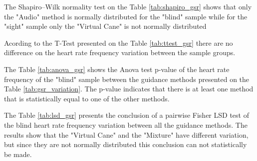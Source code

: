 
%
%    
%
%
%
%
%    
%
The Shapiro–Wilk normality test on the Table \ref{tab:shapiro_gsr} shows that only the "Audio" method is normally distributed for the "blind" sample while for the "sight" sample only the "Virtual Cane" is not normally distributed



Acording to the T-Test presented on the Table \ref{tab:ttest_gsr} there are no difference on the heart rate frequency variation between the sample groups.



The Table \ref{tab:anova_gsr} shows the Anova test p-value of the heart rate frequency of the "blind" sample between the guidance methods presented on the Table \ref{tab:gsr_variation}. The p-value indicates that there is at least one method that is statistically equal to one of the other methods.



The Table \ref{tab:lsd_gsr} presents the conclusion of a pairwise Fisher LSD test of the blind heart rate frequency variation between all the guidance methods. The results show that the "Virtual Cane" and the "Mixture" have different variation, but since they are not normally distributed this conclusion can not statistically be made.



